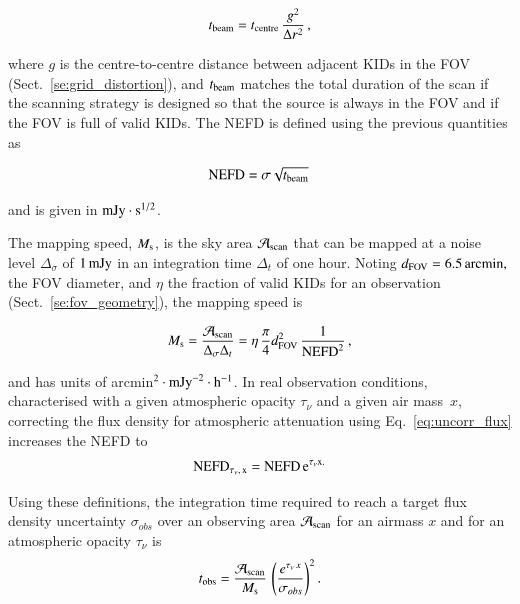 \documentclass[traditionalabstract]{aa}
\newcommand{\taunu}{\tau_{\nu}}
\newcommand{\airmass}{air mass}
\begin{document}
{\begin{equation}
  t_{\rm{beam}} = t_{\rm{centre}}\, \frac{g^2}{\Delta r^2}\,,
\label{eq:t_det}
\end{equation}

where $g$ is the centre-to-centre distance between adjacent KIDs in the FOV
(Sect.~\ref{se:grid_distortion}), and $t_{\rm{beam}}$ matches the total duration of
the scan if the scanning strategy is designed so that the source is always in
the FOV and if the FOV is full of valid KIDs. The NEFD is defined
using the previous quantities as 

\begin{equation}
  \rm{NEFD} = \sigma \sqrt{t_{\rm{beam}}}\, 
\label{eq:nefd_def}
\end{equation}

and is given in $\rm{mJy}\cdot s^{1/2}$.

The mapping speed, $M_{\rm{s}}$, is the sky area $\mathcal{A}_{\rm{scan}}$ that
can be mapped at a noise level $\Delta_\sigma$ of $1\,\rm{mJy}$ in an
integration time $\Delta_t$ of one hour. Noting $d_{\rm{FOV}} =
6.5\,\rm{arcmin,}$ the FOV diameter, and $\eta$ the fraction of valid KIDs for an
observation (Sect.~\ref{se:fov_geometry}), the mapping speed is

\begin{equation}
M_{\rm{s}} = \frac{\mathcal{A}_{\rm{scan}}}{\Delta_\sigma\Delta_t} = 
\eta \, \frac{\pi}{4} d_{\rm{FOV}}^2 \, \frac{1}{\rm{NEFD}^2}\, ,
\label{eq:mapping_speed}
\end{equation}

and has units of arcmin$^2 \cdot \rm{mJy}^{-2} \cdot \rm{h}^{-1}$. 
In real observation conditions, characterised with a given atmospheric
opacity $\taunu$ and a given \airmass\ $x$, correcting the flux
density for atmospheric attenuation using Eq.~\ref{eq:uncorr_flux}   
increases the NEFD to 
\begin{equation}
\rm{NEFD}_{\taunu,\, x} = \rm{NEFD}\, e^{\taunu x.}
\label{eq:nefd_tau_el}
\end{equation}

Using these definitions, the integration time required to reach a target flux density uncertainty $\sigma_{obs}$ over an observing area
$\mathcal{A}_{\rm{scan}}$ for an airmass $x$ and for an atmospheric opacity $\taunu$ is
\begin{equation}
  t_{\rm{obs}} = \frac{\mathcal{A}_{\rm{scan}}}{ M_{\rm{s}}} \, \left(\frac{e^{\taunu\, x}}{\sigma_{obs}}\right)^2.
\end{equation}

}
\end{document}
